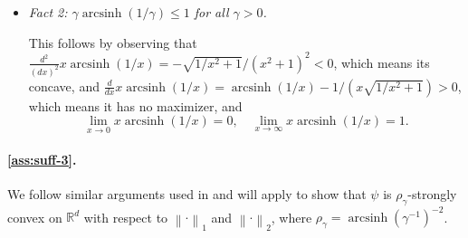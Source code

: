 \documentclass[a4paper]{article}
\newcommand{\norm}[1]{\left\|#1\right\|}
\newcommand{\RR}[0]{\mathbb{R}}
\DeclareMathOperator{\arcsinh}{arcsinh}
\theoremstyle{thmstyle}
\theoremstyle{defstyle}
\theoremstyle{remark}
\begin{document}
\begin{itemize}
\item \emph{Fact 2: $\gamma \arcsinh(1/\gamma)\leq 1$ for all $\gamma>0$.}

    This follows by observing that $\frac{d^2}{(dx)^2} x\arcsinh(1/x)=-\sqrt{1/x^2+1}/(x^2+1)^2 <0$, which means its concave, and $\frac{d}{dx} x\arcsinh(1/x) =\arcsinh(1/x)-1/(x\sqrt{1/x^2+1})>0$, which means it has no maximizer, and
    \begin{equation*}
        \lim_{x\to 0} x\arcsinh(1/x) = 0, \quad \lim_{x\to \infty} x\arcsinh(1/x) = 1.
    \end{equation*}
\end{itemize}

\paragraph{\ref{ass:suff-3}.} We follow similar arguments used in \cite{Ghai2020} and will apply \cite[Theorem 3]{Yu2015strongconvexity} to show that $\psi$ is $\rho_{\gamma}$-strongly convex on $\RR^d$ with respect to $\norm{\cdot}_1$ and $\norm{\cdot}_2$, where $\rho_{\gamma} = \arcsinh(\gamma^{-1})^{-2}$.
\end{document}
